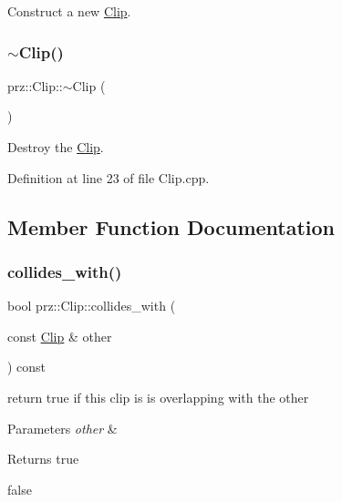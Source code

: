 Construct a new \mbox{\hyperlink{classprz_1_1_clip}{Clip}}. 

\mbox{\label{classprz_1_1_clip_ad59d81a794768f8fac2285b704b26ceb}} 
\subsubsection{\texorpdfstring{$\sim$Clip()}{~Clip()}}
{\footnotesize\ttfamily prz\+::\+Clip\+::$\sim$\+Clip (\begin{DoxyParamCaption}{ }\end{DoxyParamCaption})}



Destroy the \mbox{\hyperlink{classprz_1_1_clip}{Clip}}. 



Definition at line 23 of file Clip.\+cpp.



\subsection{Member Function Documentation}
\mbox{\label{classprz_1_1_clip_a9dfa0b18535130c4b1f69e2f25d08c05}} 
\subsubsection{\texorpdfstring{collides\_with()}{collides\_with()}}
{\footnotesize\ttfamily bool prz\+::\+Clip\+::collides\+\_\+with (\begin{DoxyParamCaption}\item[{const \mbox{\hyperlink{classprz_1_1_clip}{Clip}} \&}]{other }\end{DoxyParamCaption}) const}



return true if this clip is is overlapping with the other 


\begin{DoxyParams}{Parameters}
{\em other} & \\
\hline
\end{DoxyParams}
\begin{DoxyReturn}{Returns}
true 

false 
\end{DoxyReturn}


